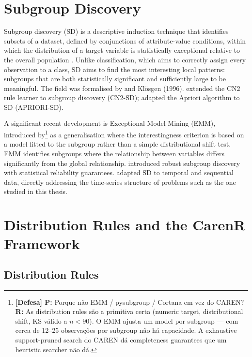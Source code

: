 \section{Subgroup Discovery}\label{sec:subgroup_discovery}

Subgroup discovery (SD) is a descriptive induction technique that identifies subsets of a dataset, defined by conjunctions of attribute-value conditions, within which the distribution of a target variable is statistically exceptional relative to the overall population \citep{Herrera2011}. Unlike classification, which aims to correctly assign every observation to a class, SD aims to find the most interesting local patterns: subgroups that are both statistically significant and sufficiently large to be meaningful. The field was formalised by \citet{Wrobel1997} and Klösgen (1996). \citet{Lavrac2004} extended the CN2 rule learner \citep{Clark1989} to subgroup discovery (CN2-SD); \citet{Kav2006} adapted the Apriori algorithm to SD (APRIORI-SD).

A significant recent development is Exceptional Model Mining (EMM), introduced by\footnote{\textbf{[Defesa] P:} Porque não EMM / pysubgroup / Cortana em vez do CAREN? \textbf{R:} As distribution rules são a primitiva certa (numeric target, distributional shift, KS válido a $n<90$). O EMM ajusta um model por subgroup --- com cerca de 12--25 observações por subgroup não há capacidade. A exhaustive support-pruned search do CAREN dá completeness guarantees que um heuristic searcher não dá.} \citet{Duivesteijn2016} as a generalisation where the interestingness criterion is based on a model fitted to the subgroup rather than a simple distributional shift test. EMM identifies subgroups where the relationship between variables differs significantly from the global relationship. \citet{Lemmerich2022} introduced robust subgroup discovery with statistical reliability guarantees. \citet{Zimmermann2019} adapted SD to temporal and sequential data, directly addressing the time-series structure of problems such as the one studied in this thesis.


\section{Distribution Rules and the CarenR Framework}\label{sec:distribution_rules_and_the}


\subsection{Distribution Rules}\label{sub:distribution_rules}

